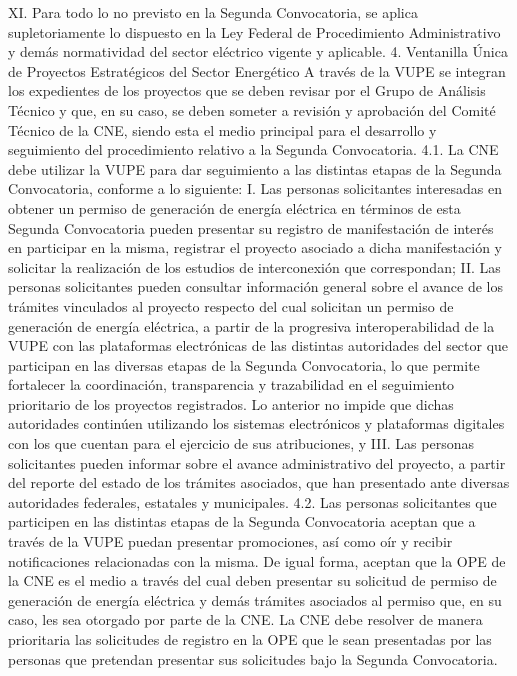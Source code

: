 XI. Para todo lo no previsto en la Segunda Convocatoria, se aplica supletoriamente lo dispuesto en la Ley Federal de Procedimiento Administrativo y demás normatividad del sector eléctrico vigente y aplicable.
4. Ventanilla Única de Proyectos Estratégicos del Sector Energético
A través de la VUPE se integran los expedientes de los proyectos que se deben revisar por el Grupo de Análisis Técnico y que, en su caso, se deben someter a revisión y aprobación del Comité Técnico de la CNE, siendo esta el medio principal para el desarrollo y seguimiento del procedimiento relativo a la Segunda Convocatoria.
4.1. La CNE debe utilizar la VUPE para dar seguimiento a las distintas etapas de la Segunda Convocatoria, conforme a lo siguiente:
I. Las personas solicitantes interesadas en obtener un permiso de generación de energía eléctrica en términos de esta Segunda Convocatoria pueden presentar su registro de manifestación de interés en participar en la misma, registrar el proyecto asociado a dicha manifestación y solicitar la realización de los estudios de interconexión que correspondan;
II. Las personas solicitantes pueden consultar información general sobre el avance de los trámites vinculados al proyecto respecto del cual solicitan un permiso de generación de energía eléctrica, a partir de la progresiva interoperabilidad de la VUPE con las plataformas electrónicas de las distintas autoridades del sector que participan en las diversas etapas de la Segunda Convocatoria, lo que permite fortalecer la coordinación, transparencia y trazabilidad en el seguimiento prioritario de los proyectos registrados. Lo anterior no impide que dichas autoridades continúen utilizando los sistemas electrónicos y plataformas digitales con los que cuentan para el ejercicio de sus atribuciones, y
III. Las personas solicitantes pueden informar sobre el avance administrativo del proyecto, a partir del reporte del estado de los trámites asociados, que han presentado ante diversas autoridades federales, estatales y municipales.
4.2. Las personas solicitantes que participen en las distintas etapas de la Segunda Convocatoria aceptan que a través de la VUPE puedan presentar promociones, así como oír y recibir notificaciones relacionadas con la misma. De igual forma, aceptan que la OPE de la CNE es el medio a través del cual deben presentar su solicitud de permiso de generación de energía eléctrica y demás trámites asociados al permiso que, en su caso, les sea otorgado por parte de la CNE.
La CNE debe resolver de manera prioritaria las solicitudes de registro en la OPE que le sean presentadas por las personas que pretendan presentar sus solicitudes bajo la Segunda Convocatoria.\par
